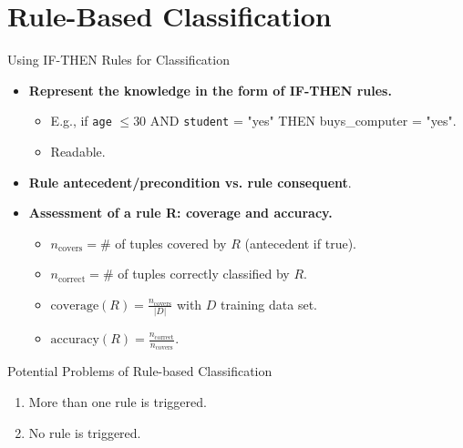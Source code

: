 \section{Rule-Based Classification}

\begin{frame}{Using \uppercase{if-then} Rules for Classification}
	\begin{itemize}
		\item \textbf{Represent the knowledge in the form of {\color{airforceblue}IF-THEN rules}.}
		      \begin{itemize}
			      \item E.g., if \texttt{age} $\leq 30$ AND \texttt{student} = "yes" THEN buys\_computer = "yes".
			      \item Readable.
		      \end{itemize}
		\item \textbf{Rule {\color{airforceblue}antecedent/precondition} vs. rule {\color{airforceblue}consequent}}.
		\item \textbf{Assessment of a rule R: coverage and accuracy.}
		      \begin{itemize}
			      \item $n_{\text{covers}} = \#$ of tuples covered by $R$ (antecedent if true).
			      \item $n_{\text{correct}} = \#$ of tuples correctly classified by $R$.
			      \item $\text{coverage}(R) = \frac{n_{\text{covers}}}{|D|}$ with $D$ training data set.
			      \item $\text{accuracy}(R) = \frac{n_{\text{correct}}}{n_{\text{covers}}}$.
		      \end{itemize}
	\end{itemize}
\end{frame}

\begin{frame}[c]{Potential Problems of Rule-based Classification}
	\centering
	\huge
	\begin{enumerate}
		\item More than one rule is triggered.
		\item No rule is triggered.
	\end{enumerate}
\end{frame}

